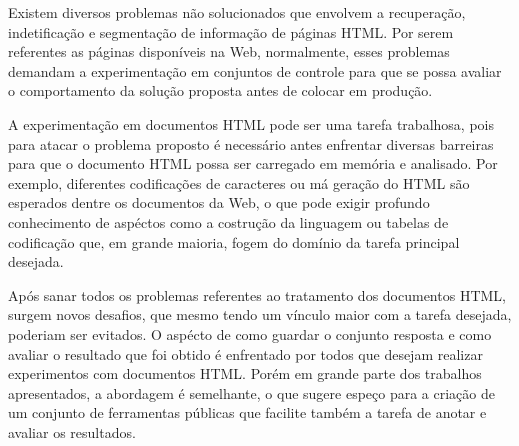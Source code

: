 \documentclass[12pt, a4paper]{article}
\begin{document}

Existem diversos problemas não solucionados que envolvem a
recuperação, indetificação e segmentação de 
informação de páginas HTML. Por serem referentes as
páginas disponíveis na Web, normalmente, esses problemas demandam a
experimentação em conjuntos de controle para que se possa avaliar o
comportamento da solução proposta antes de colocar em produção.


A experimentação em documentos HTML pode ser uma tarefa trabalhosa, pois
para atacar o problema proposto é necessário antes enfrentar diversas
barreiras para que o documento HTML possa ser carregado em memória e
analisado. Por exemplo, diferentes codificações de caracteres ou má geração do
HTML são esperados dentre os documentos da Web, o que pode 
exigir profundo conhecimento de aspéctos como a costrução da linguagem ou
tabelas de codificação que, em grande maioria, fogem do domínio da tarefa
principal desejada.



Após sanar todos os problemas referentes ao tratamento dos documentos
HTML, surgem novos desafios, que mesmo tendo um vínculo maior com a tarefa
desejada, poderiam ser evitados. O aspécto de como guardar o conjunto
resposta e como avaliar o resultado que foi obtido é enfrentado por
todos que desejam realizar experimentos com documentos HTML. Porém em
grande parte dos trabalhos apresentados, a abordagem é semelhante, o que
sugere espeço para a criação de um conjunto de ferramentas públicas que
facilite também a tarefa de anotar e avaliar os resultados.
\end{document}
